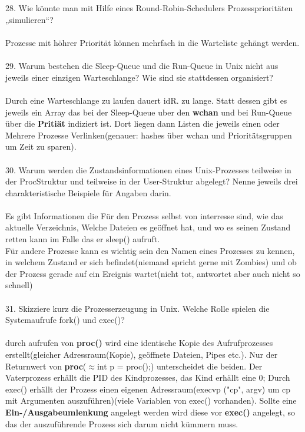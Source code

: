 \documentclass{article}
\begin{document}
\\
\\
28. Wie könnte man mit Hilfe eines Round-Robin-Schedulers Prozessprioritäten „simulieren“?
\\
\\
Prozesse mit h\"ohrer Priorit\"at k\"onnen mehrfach in die Warteliste geh\"angt werden.
\\
\\
29. Warum bestehen die Sleep-Queue und die Run-Queue in Unix nicht aus jeweils einer
einzigen Warteschlange? Wie sind sie stattdessen organisiert?
\\
\\
Durch eine Warteschlange zu laufen dauert idR. zu lange. Statt dessen gibt es jeweils ein Array das bei der Sleep-Queue uber den \textbf{wchan} und bei Run-Queue \"uber die \textbf{Priti\"at} indiziert ist. Dort liegen dann Listen die jeweils einen oder Mehrere Prozesse Verlinken(genauer: hashes \"uber wchan und Priorit\"atsgruppen um Zeit zu sparen).
\\
\\
30. Warum werden die Zustandsinformationen eines Unix-Prozesses teilweise in der ProcStruktur und teilweise in der User-Struktur abgelegt? Nenne jeweils drei charakteristische
Beispiele für Angaben darin.
\\
\\
Es gibt Informationen die F\"ur den Prozess selbst von interresse sind, wie das aktuelle Verzeichnis, Welche Dateien es ge\"offnet hat, und wo es seinen Zustand retten kann im Falle das er sleep() aufruft.\\
F\"ur andere Prozesse kann es wichtig sein den Namen eines Prozesses zu kennen, in welchem Zustand er sich befindet(niemand spricht gerne mit Zombies) und ob der Prozess gerade auf ein Ereignis wartet(nicht tot, antwortet aber auch nicht so schnell)
\\
\\
31. Skizziere kurz die Prozesserzeugung in Unix. Welche Rolle spielen die Systemaufrufe fork()
und exec()?
\\
\\
durch aufrufen von \textbf{proc()} wird eine identische Kopie des Aufrufprozesses erstellt(gleicher Adressraum(Kopie), ge\"offnete Dateien, Pipes etc.). Nur der Returnwert von \textbf{proc}($\approx$int p = proc();) unterscheidet die beiden. Der Vaterprozess erh\"allt die PID des Kindprozesses, das Kind erh\"allt eine 0;
Durch exec() erh\"allt der Prozess einen eigenen Adressraum(execvp ("cp", argv) um cp mit Argumenten auszuf\"uhren)(viele Variablen von exec() vorhanden). Sollte eine \textbf{Ein-/Ausgabeumlenkung} angelegt werden wird diese vor \textbf{exec()} angelegt, so das der auszuf\"uhrende Prozess sich darum nicht k\"ummern muss.\\
\end{document}
